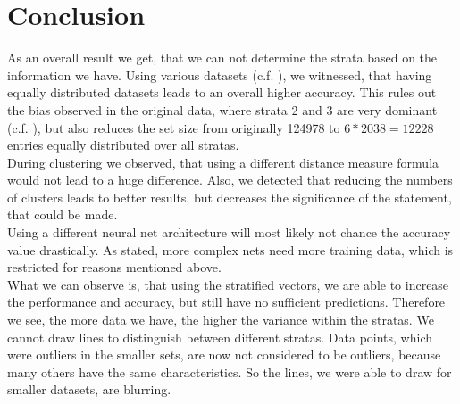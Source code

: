 \section{Conclusion} \label{sec: observation}
	As an overall result we get, that we can not determine the strata based on the information we have.
	Using various datasets (c.f. ), we witnessed, that having equally distributed datasets leads to an overall higher accuracy. This rules out the bias observed in the original data, where strata 2 and 3 are very dominant (c.f. ), but also reduces the set size from originally 124978 to $6*2038=12228$ entries equally distributed over all stratas.\\
	During clustering we observed, that using a different distance measure formula would not lead to a huge difference. Also, we detected that reducing the numbers of clusters leads to better results, but decreases the significance of the statement, that could be made.\\
	Using a different neural net architecture will most likely not chance the accuracy value drastically. As stated, more complex nets need more training data, which is restricted for reasons mentioned above.\\
	What we can observe is, that using the stratified vectors, we are able to increase the performance and accuracy, but still have no sufficient predictions. Therefore we see, the more data we have, the higher the variance within the stratas. We cannot draw lines to distinguish between different stratas. Data points, which were outliers in the smaller sets, are now not considered to be outliers, because many others have the same characteristics. So the lines, we were able to draw for smaller datasets, are blurring.\\ %